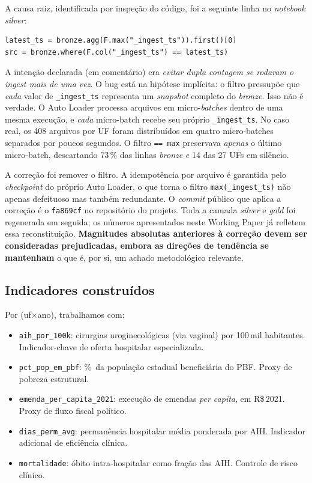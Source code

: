 \documentclass[12pt,a4paper,oneside]{article}
\newcommand{\rs}{R\$\,}
\begin{document}
A causa raiz, identificada por inspeção do código, foi a
seguinte linha no \textit{notebook silver}:

\begin{singlespace}\small
\begin{verbatim}
latest_ts = bronze.agg(F.max("_ingest_ts")).first()[0]
src = bronze.where(F.col("_ingest_ts") == latest_ts)
\end{verbatim}
\end{singlespace}

\noindent
A intenção declarada (em comentário) era \textit{evitar dupla
contagem se rodaram o ingest mais de uma vez}. O bug está na
hipótese implícita: o filtro pressupõe que \textit{cada} valor
de \texttt{\_ingest\_ts} representa um \textit{snapshot}
completo do \textit{bronze}. Isso não é verdade. O Auto Loader
processa arquivos em micro-\textit{batches} dentro de uma mesma
execução, e \textit{cada} micro-batch recebe seu próprio
\texttt{\_ingest\_ts}. No caso real, os 408 arquivos por UF
foram distribuídos em quatro micro-batches separados por
poucos segundos. O filtro \texttt{== max} preservava
\textit{apenas} o último micro-batch, descartando 73\,\% das
linhas \textit{bronze} \textit{e} 14 das 27 UFs em silêncio.

A correção foi remover o filtro. A idempotência por arquivo é
garantida pelo \textit{checkpoint} do próprio Auto Loader, o
que torna o filtro \texttt{max(\_ingest\_ts)} não apenas
defeituoso mas também redundante. O \textit{commit} público
que aplica a correção é o \texttt{fa869cf} no repositório do
projeto. Toda a camada \textit{silver} e \textit{gold} foi
regenerada em seguida; os números apresentados neste Working
Paper já refletem essa reconstituição. \textbf{Magnitudes
absolutas anteriores à correção devem ser consideradas
prejudicadas, embora as direções de tendência se mantenham}
\textemdash{} o que é, por si, um achado metodológico relevante.

\subsection{Indicadores construídos}

Por (uf$\times$ano), trabalhamos com:

\begin{itemize}
\item \texttt{aih\_por\_100k}: cirurgias uroginecológicas (via
vaginal) por 100\,mil habitantes. Indicador-chave de oferta
hospitalar especializada.
\item \texttt{pct\_pop\_em\_pbf}: \%~da população estadual
beneficiária do PBF. Proxy de pobreza estrutural.
\item \texttt{emenda\_per\_capita\_2021}: execução de emendas
\textit{per capita}, em \rs 2021. Proxy de fluxo fiscal
político.
\item \texttt{dias\_perm\_avg}: permanência hospitalar média
ponderada por AIH. Indicador adicional de eficiência clínica.
\item \texttt{mortalidade}: óbito intra-hospitalar como fração
das AIH. Controle de risco clínico.
\end{itemize}
\end{document}

